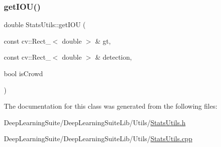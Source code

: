 \mbox{\label{class_stats_utils_a88224307181b4b86d5e611e34e77587e}} 
\subsubsection{\texorpdfstring{get\+I\+O\+U()}{getIOU()}}
{\footnotesize\ttfamily double Stats\+Utils\+::get\+I\+OU (\begin{DoxyParamCaption}\item[{const cv\+::\+Rect\+\_\+$<$ double $>$ \&}]{gt,  }\item[{const cv\+::\+Rect\+\_\+$<$ double $>$ \&}]{detection,  }\item[{bool}]{is\+Crowd }\end{DoxyParamCaption})\hspace{0.3cm}{\ttfamily [static]}}



The documentation for this class was generated from the following files\+:\begin{DoxyCompactItemize}
\item 
Deep\+Learning\+Suite/\+Deep\+Learning\+Suite\+Lib/\+Utils/\hyperlink{_stats_utils_8h}{Stats\+Utils.\+h}\item 
Deep\+Learning\+Suite/\+Deep\+Learning\+Suite\+Lib/\+Utils/\hyperlink{_stats_utils_8cpp}{Stats\+Utils.\+cpp}\end{DoxyCompactItemize}
